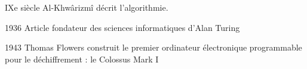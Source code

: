 \begin{frame}{IXe siècle}
    Al-Khwârizmî décrit l'algorithmie.
\end{frame}

\begin{frame}{1936}
    Article fondateur des sciences informatiques d'Alan Turing
\end{frame}

\begin{frame}{1943}
    Thomas Flowers construit le premier ordinateur électronique programmable pour le déchiffrement : le Colossus Mark I
\end{frame}

